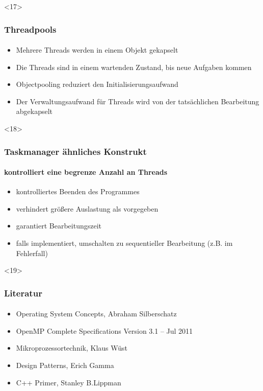 \documentclass{beamer}
\begin{document}
\begin{frame}<17>
  \frametitle{Threadpools}
  \framesubtitle{}

    \begin{itemize}
    \item  Mehrere Threads werden in einem Objekt gekapselt
    \item  Die Threads sind in einem wartenden Zustand, bis neue Aufgaben kommen 
    \item  Objectpooling reduziert den Initialisierungsaufwand
    \item  Der Verwaltungsaufwand für Threads wird von der tatsächlichen Bearbeitung abgekapselt
  \end{itemize}
  
\end{frame}

\begin{frame}<18>
  \frametitle{Taskmanager ähnliches Konstrukt}
  \framesubtitle{kontrolliert eine begrenze Anzahl an Threads}

    \begin{itemize}
    \item  kontrolliertes Beenden des Programmes
    \item  verhindert größere Auslastung als vorgegeben
    \item  garantiert Bearbeitungszeit 
    \item  falls implementiert, umschalten zu sequentieller Bearbeitung (z.B. im Fehlerfall)
  \end{itemize}
  
\end{frame}

\begin{frame}<19>
  \frametitle{Literatur}
  \framesubtitle{}

    \begin{itemize}
    \item  Operating System Concepts, Abraham Silberschatz 
    \item  OpenMP Complete Specifications Version 3.1 – Jul 2011
    \item  Mikroprozessortechnik, Klaus Wüst 
    \item  Design Patterns, Erich Gamma
    \item  C++ Primer, Stanley B.Lippman
  \end{itemize}
  
\end{frame}
\end{document}
